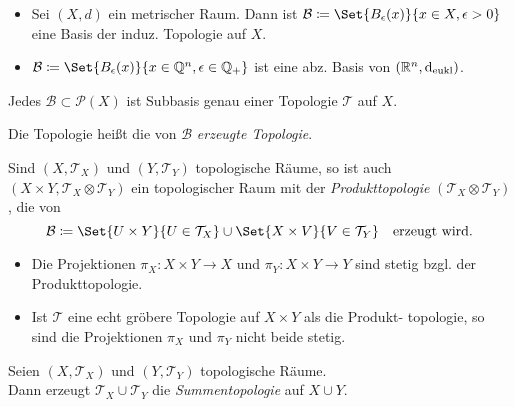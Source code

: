 \documentclass{cheat-sheet}
\newcommand{\Tau}{\mathcal{T}} %
\begin{document}
\begin{bspe}
  \begin{itemize}
    \item Sei $(X, d)$ ein metrischer Raum. Dann ist $\mathcal{B} \coloneqq \Set{B_\epsilon(x)}{x \in X, \epsilon > 0}$ eine Basis der induz. Topologie auf $X$.
    \item $\mathcal{B} \coloneqq \Set{B_\epsilon(x)}{x \in \Q^n, \epsilon \in \Q_{+}}$ ist eine abz. Basis von $(\mathbb{R}^n, \mathrm{d}_{\text{eukl}})$.
  \end{itemize}
\end{bspe}

\begin{prop}
  Jedes $\mathcal{B} \!\subset\! \mathcal{P}(X)$ ist Subbasis genau einer Topologie $\Tau$ auf $X$.
\end{prop}

\begin{defn}
  Die Topologie heißt die von $\mathcal{B}$ \emph{erzeugte Topologie}.
\end{defn}

\begin{defn}
  Sind $(X, \Tau_X)$ und $(Y, \Tau_Y)$ topologische Räume, so ist auch $(X \times Y, \Tau_X \otimes \Tau_Y)$ ein topologischer Raum mit der \emph{Produkttopologie} $(\Tau_X \otimes \Tau_Y)$, die von
  \[
    \mathcal{B} \coloneqq \Set{U \times Y}{U \in \Tau_X} \cup \Set{X \times V}{V \in \Tau_Y}
    \quad \text{erzeugt wird.}
  \]
\end{defn}

\begin{prop}
  \begin{itemize}
    \item Die Projektionen $\pi_X : X \times Y \to X$ und $\pi_Y : X \times Y \to Y$ sind stetig bzgl. der Produkttopologie.
    \item Ist $\Tau$ eine echt gröbere Topologie auf $X \times Y$ als die Produkt- topologie, so sind die Projektionen $\pi_X$ und $\pi_Y$ nicht beide stetig.
  \end{itemize}
\end{prop}


\begin{defn}
  Seien $(X, \Tau_X)$ und $(Y, \Tau_Y)$ topologische Räume. \\
  Dann erzeugt $\Tau_X \cup \Tau_Y$ die \emph{Summentopologie} auf $X \cup Y$.
\end{defn}
\end{document}
